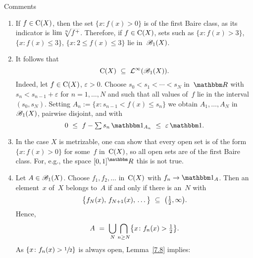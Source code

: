 \documentclass[main.tex]{subfiles}
\begin{document}
%
%
\begin{psec}{7.10}{Comments}
\begin{enumerate}
\item\label{7.10-1}
If $f\in\mathrm{C}(X)$,
then the set $\{x\colon f(x)>0\}$ is of the first Baire class,
as its indicator is $\lim \smash{\sqrt[n]{f^+}}$.
Therefore,
if $f\in\mathrm{C}(X)$,
sets such as $\{x\colon f(x)>3\}$,
$\{x\colon f(x)\leq 3 \}$,
$\{x\colon 2\leq f(x)\leq 3\}$ lie in~$\mathscr{B}_1(X)$.
%
\item\label{7.10-2}
It follows that
\begin{equation*}
\Cont{X}\ \subseteq\ \BLeb(\BaireI(X))\htam{.}
\end{equation*}
Indeed,
let $f\in\mathrm{C}(X)$, $\varepsilon>0$.
Choose $s_0<s_1<\dotsb<s_N$ in~$\R$
with $s_n<s_{n-1}+\varepsilon$
for $n=1,\dotsc,N$
and such that all values of~$f$ lie in the interval $(s_0,s_N)$.
Setting $A_n:=\{x\colon s_{n-1}<f(x)\leq s_n\}$
we obtain $A_1,\dotsc, A_N$ in~$\mathscr{B}_1(X)$,
pairwise disjoint, and with
\begin{equation*}
0\ \leq\ f-{\textstyle\sum}\,
 s_n\,\mathbb{1}_{A_n}\ \leq\ \varepsilon\,\mathbb{1}\htam{.}
\end{equation*}
%
\item\label{7.10-3}
In the case $X$ is metrizable,
one can show that every open set is of the form $\{x\colon f(x)>0\}$
for some~$f$ in~$\mathrm{C}(X)$,
so all open sets are of the first Baire class.
For, e.g., the space $[0,1]^\R$ this is not true.
%
\item\label{7.10-4}
Let $A\in\mathscr{B}_1(X)$.
Choose $f_1,f_2,\dotsc$ in~$\mathrm{C}(X)$
with $f_n\ra \mathbb{1}_A$.
Then an element~$x$ of~$X$ belongs to~$A$
if and only if there is an~$N$ with
\begin{equation*}
\bigl\{ f_N(x),\, f_{N+1}(x),\, \dotsc\,\bigr\}
\ \subseteq\ \bigl(\textstyle\frac{1}{2},\infty\bigr)\text{.}
\end{equation*}
Hence,
\begin{equation*}
A\ =\ \bigcup_N \bigcap_{n\geq N} \bigl\{ 
x\colon f_n(x)>\textstyle \frac{1}{2} \bigr\}\text{.}
\end{equation*}
As $\{x\colon f_n(x)>\sfrac{1}{2}\}$ is always open,
Lemma~\ref{7.8} implies:
\end{enumerate}
\end{psec}
%
%
\end{document}
